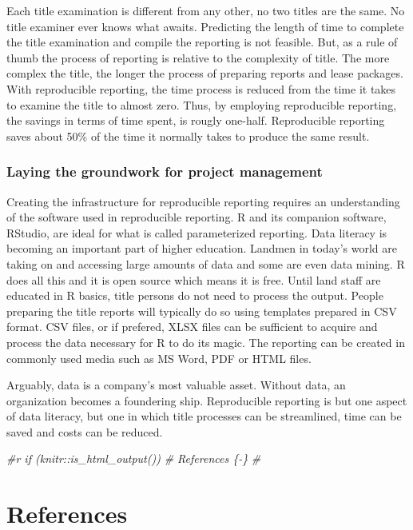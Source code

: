 \documentclass[
]{book}
\newenvironment{Shaded}{\begin{snugshade}}{\end{snugshade}}
\newcommand{\CommentTok}[1]{\textcolor[rgb]{0.56,0.35,0.01}{\textit{#1}}}
\begin{document}
Each title examination is different from any other, no two titles are the same. No title examiner ever knows what awaits. Predicting the length of time to complete the title examination and compile the reporting is not feasible. But, as a rule of thumb the process of reporting is relative to the complexity of title. The more complex the title, the longer the process of preparing reports and lease packages. With reproducible reporting, the time process is reduced from the time it takes to examine the title to almost zero. Thus, by employing reproducible reporting, the savings in terms of time spent, is rougly one-half. Reproducible reporting saves about 50\% of the time it normally takes to produce the same result.

\hypertarget{laying-the-groundwork-for-project-management}{%
\subsection{Laying the groundwork for project management}\label{laying-the-groundwork-for-project-management}}

Creating the infrastructure for reproducible reporting requires an understanding of the software used in reproducible reporting. R and its companion software, RStudio, are ideal for what is called parameterized reporting. Data literacy is becoming an important part of higher education. Landmen in today's world are taking on and accessing large amounts of data and some are even data mining. R does all this and it is open source which means it is free. Until land staff are educated in R basics, title persons do not need to process the output. People preparing the title reports will typically do so using templates prepared in CSV format. CSV files, or if prefered, XLSX files can be sufficient to acquire and process the data necessary for R to do its magic. The reporting can be created in commonly used media such as MS Word, PDF or HTML files.

Arguably, data is a company's most valuable asset. Without data, an organization becomes a foundering ship. Reproducible reporting is but one aspect of data literacy, but one in which title processes can be streamlined, time can be saved and costs can be reduced.

\begin{Shaded}
\begin{Highlighting}[]
\CommentTok{\#\textasciigrave{}r if (knitr::is\_html\_output()) \textquotesingle{}}
\CommentTok{\# References \{{-}\}}
\CommentTok{\#\textquotesingle{}\textasciigrave{}}
\end{Highlighting}
\end{Shaded}

\hypertarget{references}{%
\chapter*{References}\label{references}}

  
\end{document}
